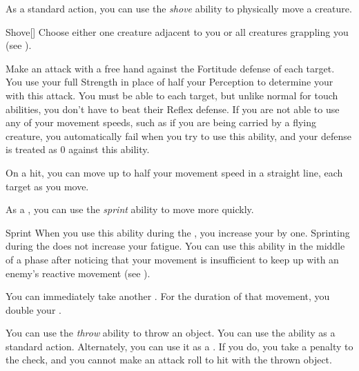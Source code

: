         \label{Shove} As a standard action, you can use the \textit{shove} ability to physically move a creature.

        \begin{activeability}{Shove}[]
            \rankline
            Choose either one creature adjacent to you or all creatures grappling you (see ).

            Make an attack with a free hand against the Fortitude defense of each target.
            You use your full Strength in place of half your Perception to determine your  with this attack.
            You must be able to  each target, but unlike normal for touch abilities, you don't have to beat their Reflex defense.
            If you are not able to use any of your movement speeds, such as if you are being carried by a flying creature, you automatically fail when you try to use this ability, and your defense is treated as 0 against this ability.

            On a hit, you can move up to half your movement speed in a straight line,  each target as you move.
        \end{activeability}

        \label{Sprint} As a , you can use the \textit{sprint} ability to move more quickly.

        \begin{activeability}{Sprint}
            \rankline
            When you use this ability during the , you increase your  by one.
            Sprinting during the  does not increase your fatigue.
            You can use this ability in the middle of a phase after noticing that your movement is insufficient to keep up with an enemy's reactive movement (see ).

            You can immediately take another .
            For the duration of that movement, you double your .
        \end{activeability}

        \label{Throw} You can use the \textit{throw} ability to throw an object.
        You can use the ability as a standard action.
        Alternately, you can use it as a .
        If you do, you take a  penalty to the check, and you cannot make an attack roll to hit with the thrown object.

